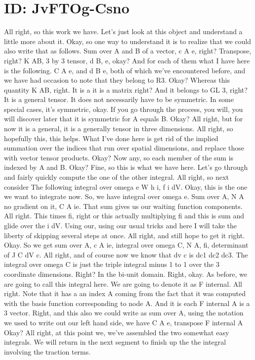 \documentclass[10pt]{article}
\begin{document}
\section*{ID: JvFTOg-Csno}
All right, so this work we have. Let's just look at this object and understand a little more about it. Okay, so one way to understand it is to realize that we could also write that as follows. Sum over A and B of a vector, c A e, right? Transpose, right? K AB, 3 by 3 tensor, d B, e, okay? And for each of them what I have here is the following. C A e, and d B e, both of which we've encountered before, and we have had occasion to note that they belong to R3. Okay? Whereas this quantity K AB, right. It is a it is a matrix right? And it belongs to GL 3, right? It is a general tensor. It does not necessarily have to be symmetric. In some special cases, it's symmetric, okay. If you go through the process, you will, you will discover later that it is symmetric for A equals B. Okay? All right, but for now it is a general, it is a generally tensor in three dimensions. All right, so hopefully this, this helps. What I've done here is get rid of the implied summation over the indices that run over spatial dimensions, and replace those with vector tensor products. Okay? Now any, so each member of the sum is indexed by A and B. Okay? Fine, so this is what we have here. Let's go through and fairly quickly compute the one of the other integral. All right, so next consider The following integral over omega e W h i, f i dV. Okay, this is the one we want to integrate now. So, we have integral over omega e. Sum over A, N A no gradient on it, C A ie. That sum gives us our waiting function components. All right. This times fi, right or this actually multiplying fi and this is sum and glide over the i dV. Using our, using our usual tricks and here I will take the liberty of skipping several steps at once. All right, and still hope to get it right. Okay. So we get sum over A, c A ie, integral over omega C, N A, fi, determinant of J C dV c. All right, and of course now we know that dv c is dc1 dc2 dc3. The integral over omega C is just the triple integral minus 1 to 1 over the 3 coordinate dimensions. Right? In the bi-unit domain. Right, okay. As before, we are going to call this integral here. We are going to denote it as F internal. All right. Note that it has a an index A coming from the fact that it was computed with the basis function corresponding to node A. And it is each F internal A is a 3 vector. Right, and this also we could write as sum over A, using the notation we used to write out our left hand side, we have C A e, transpose F internal A Okay? All right, at this point we, we've assembled the two somewhat easy integrals. We will return in the next segment to finish up the the integral involving the traction terms.
\end{document}
